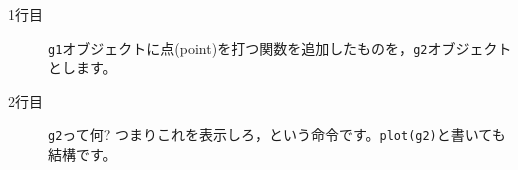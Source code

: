 \begin{description}
	\item[1行目] \texttt{g1}オブジェクトに点(point)を打つ関数を追加したものを，\texttt{g2}オブジェクトとします。
	\item[2行目] \texttt{g2}って何? つまりこれを表示しろ，という命令です。\texttt{plot(g2)}と書いても結構です。
\end{description}
